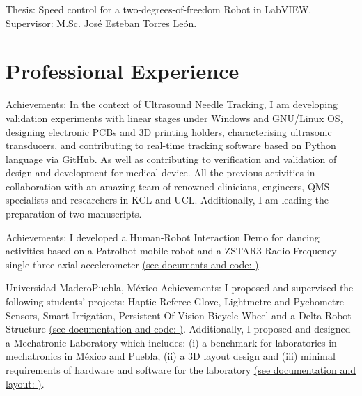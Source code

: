 \documentclass[10pt,a4paper,roman]{moderncv}
\begin{document}
  {Thesis: Speed control for a two-degrees-of-freedom Robot in LabVIEW.
  \href{https://github.com/mxochicale/publications/blob/master/thesis/B.Eng./doc/MPXochicale_BachelorEngThesis-2003.pdf}{\faFilePdfO}
  \href{https://github.com/mxochicale/publications/tree/master/thesis/B.Eng.}{\faGithubAlt}
  \\ Supervisor: M.Sc. Jos\'e Esteban Torres Le\'on.}




\section{Professional Experience}

{Achievements:
In the context of Ultrasound Needle Tracking,
I am developing validation experiments with linear stages under Windows and GNU/Linux OS, 
designing electronic PCBs and 3D printing holders, 
characterising ultrasonic transducers, 
and contributing to real-time tracking software based on Python language
via GitHub. 
As well as contributing to verification and validation 
of design and development for medical device. 
All the previous activities in collaboration with an amazing 
team of renowned clinicians, engineers, QMS specialists and researchers in KCL and UCL.
Additionally, I am leading the preparation of two manuscripts.
}


{Achievements: I developed a Human-Robot Interaction Demo for dancing activities based on 
a Patrolbot mobile robot and a ZSTAR3 Radio Frequency single three-axial accelerometer 
\href{https://sites.google.com/site/perezxochicale/projects/demodance}{(see documents and code: \faExternalLink)}.
}

{Universidad Madero}{Puebla, M\'exico}{}
{Achievements:
I proposed and supervised the following students' projects: Haptic Referee Glove,
 Lightmetre and Pychometre Sensors, Smart Irrigation, Persistent Of Vision Bicycle Wheel
 and a Delta Robot Structure 
\href{https://sites.google.com/site/perezxochicaleprojects/studentprojects}{(see documentation and code: \faExternalLink)}.
Additionally, I proposed and designed a Mechatronic Laboratory which includes: 
(i) a benchmark for laboratories in mechatronics in M\'exico and Puebla, 
(ii) a 3D layout design and 
(iii) minimal requirements of hardware and software for the laboratory
 \href{https://sites.google.com/site/perezxochicaleprojects/mechatronicslaboratorydesign}{(see documentation and layout: \faExternalLink)}.
}
\end{document}
